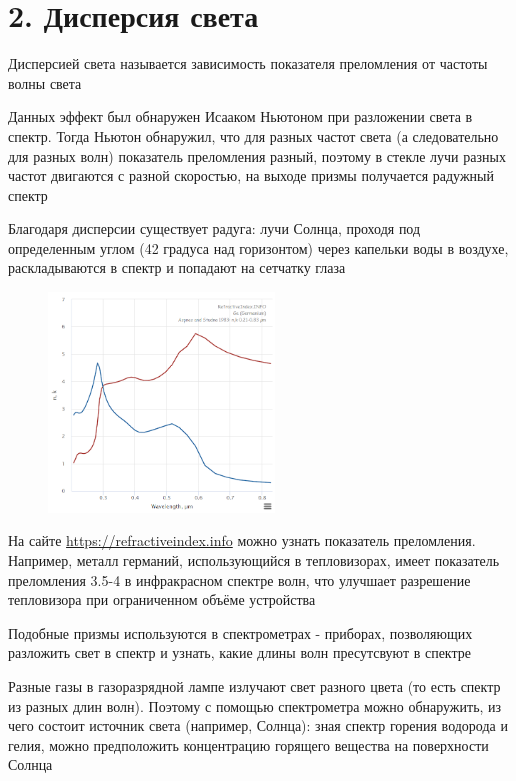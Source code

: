 \documentclass[12pt]{article}
\begin{document}
\section{2. Дисперсия света}

Дисперсией света называется зависимость показателя преломления от частоты волны света

Данных эффект был обнаружен Исааком Ньютоном при разложении света в спектр. Тогда Ньютон обнаружил, что для разных частот света (а следовательно для разных волн) показатель преломления разный, поэтому в стекле лучи разных частот двигаются с разной скоростью, на выходе призмы получается радужный спектр 

Благодаря дисперсии существует радуга: лучи Солнца, проходя под определенным углом (42 градуса над горизонтом) через капельки воды в воздухе, раскладываются в спектр и попадают на сетчатку глаза

\begin{figure}
    \includegraphics[width=6cm]{physics3/images/physics3_germanium_refractive_index}
\end{figure}

На сайте \url{https://refractiveindex.info} можно узнать показатель преломления. Например, металл германий, использующийся в тепловизорах, имеет показатель преломления 3.5-4 в инфракрасном спектре волн, что улучшает разрешение тепловизора при ограниченном объёме устройства

Подобные призмы используются в спектрометрах - приборах, позволяющих разложить свет в спектр и узнать, какие длины волн пресутсвуют в спектре

Разные газы в газоразрядной лампе излучают свет разного цвета (то есть спектр из разных длин волн). Поэтому с помощью спектрометра можно обнаружить, из чего состоит источник света (например, Солнца): зная спектр горения водорода и гелия, можно предположить концентрацию горящего вещества на поверхности Солнца
\end{document}

